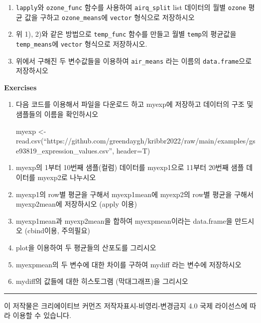 \documentclass[
  a4paper,
]{book}
\begin{document}
\begin{enumerate}
\def\labelenumi{\arabic{enumi})}
\setcounter{enumi}{1}
\item
  \texttt{lapply}와 \texttt{ozone\_func} 함수를 사용하여
  \texttt{airq\_split} list 데이터의 월별 \texttt{ozone} 평균 값을
  구하고 \texttt{ozone\_means}에 \texttt{vector} 형식으로 저장하시오
\item
  위 1), 2)와 같은 방법으로 \texttt{temp\_func} 함수를 만들고 월별
  \texttt{temp}의 평균값을 \texttt{temp\_means}에 \texttt{vector}
  형식으로 저장하시오.
\item
  위에서 구해진 두 변수값들을 이용하여 \texttt{air\_means} 라는 이름의
  \texttt{data.frame}으로 저장하시오
\end{enumerate}

\textbf{Exercises}

\begin{enumerate}
\def\labelenumi{\arabic{enumi})}
\item
  다음 코드를 이용해서 파일을 다운로드 하고 myexp에 저장하고 데이터의
  구조 및 샘플들의 이름을 확인하시오

  myexp \textless-
  read.csv(``https://github.com/greendaygh/kribbr2022/raw/main/examples/gse93819\_expression\_values.csv'',
  header=T)
\end{enumerate}

\begin{enumerate}
\def\labelenumi{\arabic{enumi}.}
\setcounter{enumi}{1}
\item
  myexp의 1부터 10번째 샘플(컬럼) 데이터를 myexp1으로 11부터 20번째 샘플
  데이터를 myexp2로 나누시오
\item
  myexp1의 row별 평균을 구해서 myexp1mean에 myexp2의 row별 평균을 구해서
  myexp2mean에 저장하시오 (apply 이용)
\item
  myexp1mean과 myexp2mean을 합하여 myexpmean이라는 data.frame을 만드시오
  (cbind이용, 주의필요)
\item
  plot을 이용하여 두 평균들의 산포도를 그리시오
\item
  myexpmean의 두 변수에 대한 차이를 구하여 mydiff 라는 변수에 저장하시오
\item
  mydiff의 값들에 대한 히스토그램 (막대그래프)을 그리시오
\end{enumerate}

\begin{center}\rule{0.5\linewidth}{0.5pt}\end{center}

이 저작물은 크리에이티브 커먼즈 저작자표시-비영리-변경금지 4.0 국제
라이선스에 따라 이용할 수 있습니다.
\end{document}
